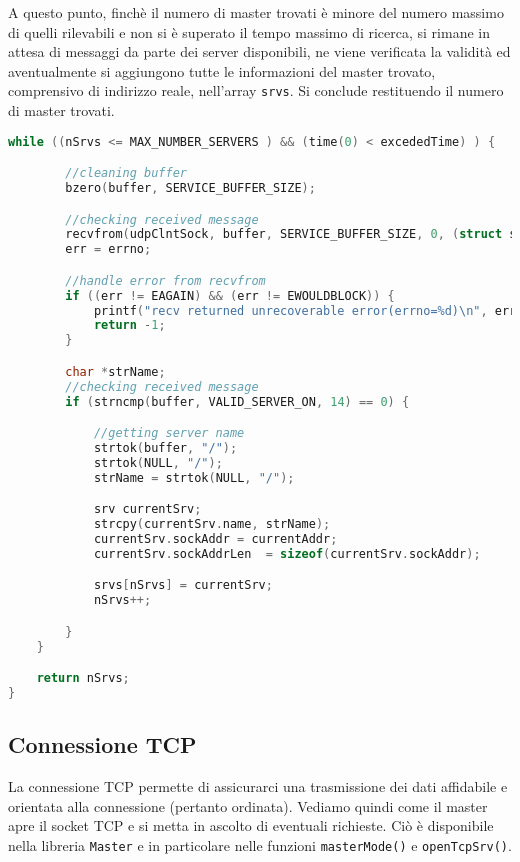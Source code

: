 \documentclass[11pt,fleqn]{book} %
\begin{document}
A questo punto, finchè il numero di master trovati è minore del numero massimo di quelli rilevabili e non si è superato il tempo massimo di ricerca, si rimane in attesa di messaggi da parte dei server disponibili, ne viene verificata la validità ed aventualmente si aggiungono tutte le informazioni del master trovato, comprensivo di indirizzo reale, nell'array \texttt{srvs}. Si conclude restituendo il numero di master trovati.

\begin{lstlisting}[language=C]
while ((nSrvs <= MAX_NUMBER_SERVERS ) && (time(0) < excededTime) ) {

		//cleaning buffer
		bzero(buffer, SERVICE_BUFFER_SIZE);

		//checking received message
		recvfrom(udpClntSock, buffer, SERVICE_BUFFER_SIZE, 0, (struct sockaddr *) &currentAddr, &currentAddrLen);
		err = errno;

		//handle error from recvfrom
		if ((err != EAGAIN) && (err != EWOULDBLOCK)) {
      		printf("recv returned unrecoverable error(errno=%d)\n", err);
      		return -1;
      	}

		char *strName;
		//checking received message
		if (strncmp(buffer, VALID_SERVER_ON, 14) == 0) {

			//getting server name
			strtok(buffer, "/");
			strtok(NULL, "/");
			strName = strtok(NULL, "/");

			srv currentSrv;
			strcpy(currentSrv.name, strName);
			currentSrv.sockAddr = currentAddr;
			currentSrv.sockAddrLen  = sizeof(currentSrv.sockAddr);

			srvs[nSrvs] = currentSrv;
			nSrvs++;

		}	
	}

	return nSrvs;
}
\end{lstlisting}

\subsection{Connessione TCP}
La connessione TCP permette di assicurarci una trasmissione dei dati affidabile e orientata alla connessione (pertanto ordinata). Vediamo quindi come il master apre il socket TCP e si metta in ascolto di eventuali richieste.
Ciò è disponibile nella libreria \texttt{Master} e in particolare nelle funzioni \texttt{masterMode()} e \texttt{openTcpSrv()}.
\end{document}
